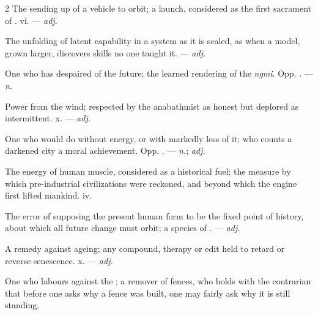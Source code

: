 \begin{multicols}{2}
 The sending up of a vehicle to orbit; a launch, considered as the first sacrament of .   vi. —  \textit{adj.}

 The unfolding of latent capability in a system as it is scaled, as when a model, grown larger, discovers skills no one taught it.  —  \textit{adj.}

 One who has despaired of the future; the learned rendering of the  \textit{ngmi}. Opp. . —  \textit{n.}

 Power from the wind; respected by the anabathmist as honest but deplored as intermittent.   x. —  \textit{adj.}

 One who would do without energy, or with markedly less of it; who counts a darkened city a moral achievement. Opp. . —  \textit{n.};  \textit{adj.}

 The energy of human muscle, considered as a historical fuel; the measure by which pre-industrial civilizations were reckoned, and beyond which the engine first lifted mankind.   iv.

 The error of supposing the present human form to be the fixed point of history, about which all future change must orbit; a species of . —  \textit{adj.}

 A remedy against ageing; any compound, therapy or edit held to retard or reverse senescence.   x. —  \textit{adj.}

 One who labours against the ; a remover of fences, who holds with the contrarian that before one asks why a fence was built, one may fairly ask why it is still standing.


\end{multicols}
